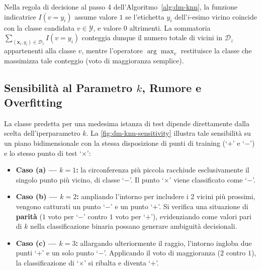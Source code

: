 \begin{algorithm}[H]
\caption{Classificatore $k$-Nearest Neighbor ($K$-NN)}
\label{alg:dm-knn}
\end{algorithm}

Nella regola di decisione al passo 4 dell'Algoritmo~\ref{alg:dm-knn}, la funzione indicatrice $I(v = y_i)$ assume valore $1$ se l'etichetta $y_i$ dell'$i$-esimo vicino coincide con la classe candidata $v \in \mathcal{Y}$, e valore $0$ altrimenti. La sommatoria $\sum_{(\mathbf{x}_i, y_i) \in \mathcal{D}_z} I(v = y_i)$ conteggia dunque il numero totale di vicini in $\mathcal{D}_z$ appartenenti alla classe $v$, mentre l'operatore $\arg\max_v$ restituisce la classe che massimizza tale conteggio (voto di maggioranza semplice).

\FloatBarrier
\subsection{Sensibilit\`a al Parametro \texorpdfstring{$k$}{k}, Rumore e Overfitting}
\label{subsec:dm-knn-k-choice}

La classe predetta per una medesima istanza di test dipende direttamente dalla scelta dell'iperparametro $k$. La \autoref{fig:dm-knn-sensitivity} illustra tale sensibilit\`a su un piano bidimensionale con la stessa disposizione di punti di training (`$+$' e `$-$') e lo stesso punto di test `$\times$':
\begin{itemize}
    \item \textbf{Caso (a) --- $k = 1$:} la circonferenza pi\`u piccola racchiude esclusivamente il singolo punto pi\`u vicino, di classe `$-$'. Il punto `$\times$' viene classificato come `$-$'.
    \item \textbf{Caso (b) --- $k = 2$:} ampliando l'intorno per includere i 2 vicini pi\`u prossimi, vengono catturati un punto `$-$' e un punto `$+$'. Si verifica una situazione di \textbf{parit\`a} ($1$ voto per `$-$' contro $1$ voto per `$+$'), evidenziando come valori pari di $k$ nella classificazione binaria possano generare ambiguit\`a decisionali.
    \item \textbf{Caso (c) --- $k = 3$:} allargando ulteriormente il raggio, l'intorno ingloba due punti `$+$' e un solo punto `$-$'. Applicando il voto di maggioranza ($2$ contro $1$), la classificazione di `$\times$' si ribalta e diventa `$+$'.
\end{itemize}

